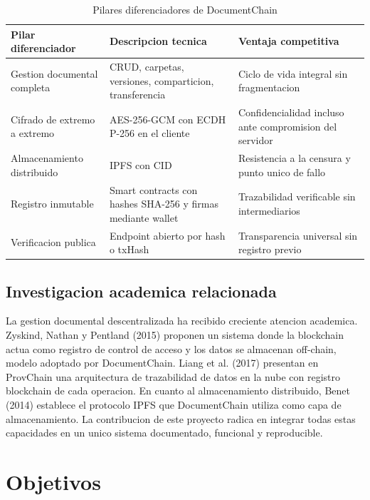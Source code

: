\documentclass[11pt, a4paper]{article}
\begin{document}
\begin{table}[H]
\centering
\renewcommand{\arraystretch}{1.4}
\small
\begin{tabular}{|p{3.5cm}|p{4cm}|p{4.5cm}|}
\hline
\textbf{Pilar diferenciador} & \textbf{Descripcion tecnica} & \textbf{Ventaja competitiva} \\
\hline
Gestion documental completa & CRUD, carpetas, versiones, comparticion, transferencia & Ciclo de vida integral sin fragmentacion \\
\hline
Cifrado de extremo a extremo & AES-256-GCM con ECDH P-256 en el cliente & Confidencialidad incluso ante compromision del servidor \\
\hline
Almacenamiento distribuido & IPFS con CID & Resistencia a la censura y punto unico de fallo \\
\hline
Registro inmutable & Smart contracts con hashes SHA-256 y firmas mediante wallet & Trazabilidad verificable sin intermediarios \\
\hline
Verificacion publica & Endpoint abierto por hash o txHash & Transparencia universal sin registro previo \\
\hline
\end{tabular}
\caption{Pilares diferenciadores de DocumentChain}
\label{tab:ventajas}
\end{table}

\subsection{Investigacion academica relacionada}

La gestion documental descentralizada ha recibido creciente atencion academica. Zyskind, Nathan y Pentland (2015) proponen un sistema donde la blockchain actua como registro de control de acceso y los datos se almacenan off-chain, modelo adoptado por DocumentChain. Liang et al. (2017) presentan en ProvChain una arquitectura de trazabilidad de datos en la nube con registro blockchain de cada operacion. En cuanto al almacenamiento distribuido, Benet (2014) establece el protocolo IPFS que DocumentChain utiliza como capa de almacenamiento. La contribucion de este proyecto radica en integrar todas estas capacidades en un unico sistema documentado, funcional y reproducible.

\section{Objetivos}
\end{document}
